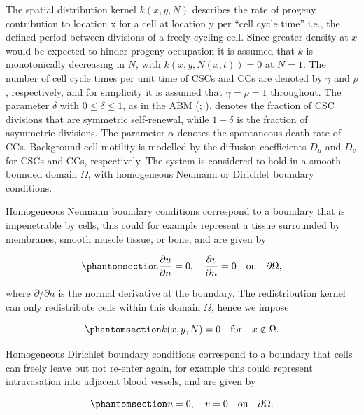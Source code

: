 \documentclass[
  letterpaper,
]{scrreprt}
\theoremstyle{definition}
\theoremstyle{remark}
\begin{document}
The spatial distribution kernel \(k(x,y,N)\) describes the rate of
progeny contribution to location x for a cell at location y per ``cell
cycle time'' i.e., the defined period between divisions of a freely
cycling cell. Since greater density at \(x\) would be expected to hinder
progeny occupation it is assumed that \(k\) is monotonically decreasing
in \(N\), with \(k(x,y,N(x,t))=0\) at \(N=1\). The number of cell cycle
times per unit time of CSCs and CCs are denoted by \(\gamma\) and
\(\rho\), respectively, and for simplicity it is assumed that
\(\gamma = \rho = 1\) throughout. The parameter \(\delta\) with
\(0 \leq \delta \leq 1\), as in the ABM
(;
), denotes the fraction of CSC
divisions that are symmetric self-renewal, while \(1-\delta\) is the
fraction of asymmetric divisions. The parameter \(\alpha\) denotes the
spontaneous death rate of CCs. Background cell motility is modelled by
the diffusion coefficients \(D_u\) and \(D_v\) for CSCs and CCs,
respectively. The system is considered to hold in a smooth bounded
domain \(\Omega\), with homogeneous Neumann or Dirichlet boundary
conditions.

Homogeneous Neumann boundary conditions correspond to a boundary that is
impenetrable by cells, this could for example represent a tissue
surrounded by membranes, smooth muscle tissue, or bone, and are given by

\begin{equation}\phantomsection\label{eq-homogeneous-neumann-boundary-conditions}{
\frac{\partial u}{\partial n} = 0, \quad \frac{\partial v}{\partial n} = 0 \quad \text{on} \quad \partial \Omega,
}\end{equation}

where \(\partial / \partial n\) is the normal derivative at the
boundary. The redistribution kernel can only redistribute cells within
this domain \(\Omega\), hence we impose

\begin{equation}\phantomsection\label{eq-redistribution-kernel-neumann-BC}{
k(x,y,N) = 0 \quad \text{for} \quad x \notin \Omega. 
}\end{equation}

Homogeneous Dirichlet boundary conditions correspond to a boundary that
cells can freely leave but not re-enter again, for example this could
represent intravasation into adjacent blood vessels, and are given by

\begin{equation}\phantomsection\label{eq-homogeneous-dirichlet-boundary-conditions}{
u = 0, \quad v = 0 \quad \text{on} \quad \partial \Omega.
}\end{equation}
\end{document}
